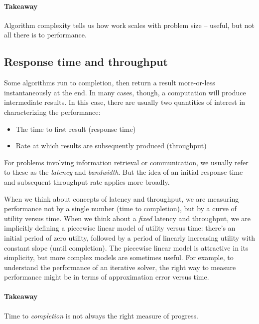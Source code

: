 \documentclass[12pt, leqno]{article} %
\begin{document}
\paragraph{Takeaway}

Algorithm complexity tells us how work scales with problem size --
useful, but not all there is to performance.

\subsection{Response time and throughput}

Some algorithms run to completion, then return a result more-or-less
instantaneously at the end. In many cases, though, a computation will
produce intermediate results. In this case, there are usually two
quantities of interest in characterizing the performance:

\begin{itemize}
\item
  The time to first result (response time)
\item
  Rate at which results are subsequently produced (throughput)
\end{itemize}

For problems involving information retrieval or communication, we
usually refer to these as the \emph{latency} and \emph{bandwidth}. But
the idea of an initial response time and subsequent throughput rate
applies more broadly.

When we think about concepts of latency and throughput, we are measuring
performance not by a single number (time to completion), but by a curve
of utility versus time. When we think about a \emph{fixed} latency and
throughput, we are implicitly defining a piecewise linear model of
utility versus time: there's an initial period of zero utility, followed
by a period of linearly increasing utility with constant slope (until
completion). The piecewise linear model is attractive in its simplicity,
but more complex models are sometimes useful. For example, to understand
the performance of an iterative solver, the right way to measure
performance might be in terms of approximation error versus time.

\paragraph{Takeaway}

Time to \emph{completion} is not always the right measure of progress.
\end{document}
